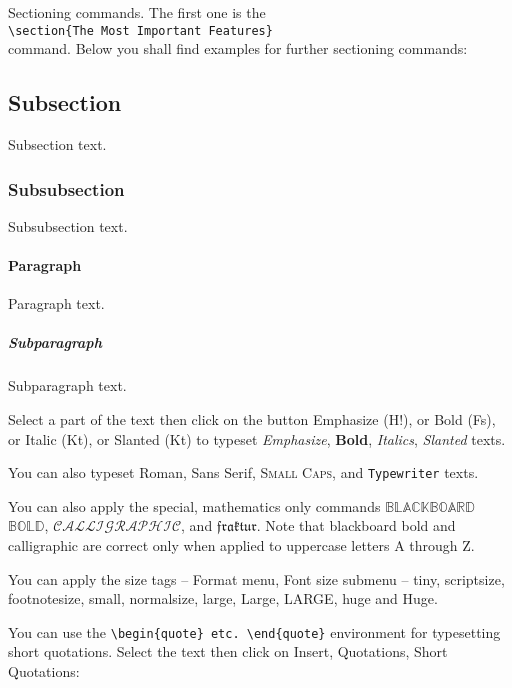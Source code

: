 \documentclass{article}%
\begin{document}
\noindent Sectioning commands. The first one is the\\
\hspace*{\fill} \verb"\section{The Most Important Features}" \hspace*{\fill}\\
command. Below you shall find examples for further sectioning commands:

\subsection{Subsection}
Subsection text.

\subsubsection{Subsubsection}
Subsubsection text.

\paragraph{Paragraph}
Paragraph text.

\subparagraph{Subparagraph}Subparagraph text.\vspace{2mm}

Select a part of the text then click on the button Emphasize (H!), or Bold (Fs), or
Italic (Kt), or Slanted (Kt) to typeset \emph{Emphasize}, \textbf{Bold},
\textit{Italics}, \textsl{Slanted} texts.

You can also typeset \textrm{Roman}, \textsf{Sans Serif}, \textsc{Small Caps}, and
\texttt{Typewriter} texts.

You can also apply the special, mathematics only commands $\mathbb{BLACKBOARD}$
$\mathbb{BOLD}$, $\mathcal{CALLIGRAPHIC}$, and $\mathfrak{fraktur}$. Note that
blackboard bold and calligraphic are correct only when applied to uppercase letters A
through Z.

You can apply the size tags -- Format menu, Font size submenu -- {\tiny tiny},
{\scriptsize scriptsize}, {\footnotesize footnotesize}, {\small small}, {\normalsize
normalsize}, {\large large}, {\Large Large}, {\LARGE LARGE}, {\huge huge} and {\Huge
Huge}.

You can use the \verb"\begin{quote} etc. \end{quote}" environment for typesetting
short quotations. Select the text then click on Insert, Quotations, Short Quotations:
\end{document}
